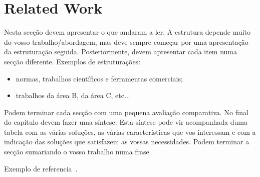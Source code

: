 \chapter{Related Work}
\label{relatedwork}
Nesta secção devem apresentar o que andaram a ler. A estrutura depende muito do
vosso trabalho/abordagem, mas deve sempre começar por uma apresentação da
estruturação seguida. Posteriormente, devem apresentar cada item numa secção
diferente. Exemplos de estruturações:
\begin{itemize}
\item normas, trabalhos científicos e ferramentas comerciais;
\item trabalhos da área B, da área C, etc...
\end{itemize}
Podem terminar cada secção com uma pequena avaliação comparativa.
No final do capítulo devem fazer uma síntese. Esta síntese pode vir acompanhada
duma tabela com as várias soluções, as várias características que vos interessam
e com a indicação das soluções que satisfazem as vossas necessidades. Podem
terminar a secção sumariando o vosso trabalho numa frase.

Exemplo de referencia~\cite{Biagioni2011}.


